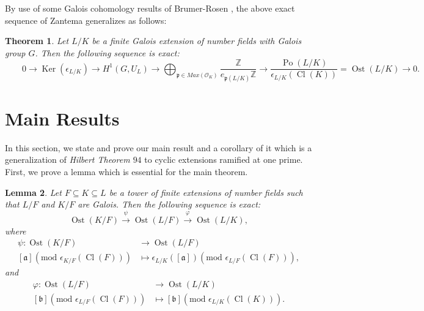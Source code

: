 \documentclass{amsart}
\newtheorem{theorem}{Theorem}[section]
\newtheorem{lemma}[theorem]{Lemma}
\theoremstyle{definition}
\numberwithin{equation}{section}
\DeclareMathOperator{\Po}{Po}
\DeclareMathOperator{\Ost}{Ost}
\DeclareMathOperator{\Cl}{Cl}
\DeclareMathOperator{\Ker}{Ker}
\begin{document}
By use of some Galois cohomology results of Brumer-Rosen \cite{Brumer-Rosen}, the above exact sequence of Zantema generalizes as follows:

\begin{theorem} \cite[Theorem 2.2]{MR2} \label{theorem, generalization of the Zantema's exact sequence}
	Let $L/K$ be a finite Galois extension of number fields with Galois group $G$. Then the following sequence is exact:
	{\footnotesize
		\begin{equation*} \label{equation, BRZ exact sequence}
				\tag{BRZ} \qquad 
			0 \rightarrow \Ker({\epsilon}_{L/K}) \rightarrow H^1(G,U_L) \rightarrow \bigoplus_{\mathfrak{p} \in Max(\mathcal{O}_K)} \frac{\mathbb{Z}}{e_{\mathfrak{p}(L/K)}\mathbb{Z}} \rightarrow \frac{\Po(L/K)}{{\epsilon}_{L/K}(\Cl(K))}=\Ost(L/K) \rightarrow 0.
	\end{equation*}}
\end{theorem}





\section{Main Results}

In this section, we state and prove our main result and a corollary of it which is a generalization of \textit{Hilbert Theorem $94$} to cyclic extensions ramified at one prime. First, we prove a lemma which is essential for the main theorem.

\begin{lemma} \label{lemma, short exact sequence of Ostrowski qoutients}
Let $F \subseteq K \subseteq L$ be a tower of finite extensions of number fields such that $L/F$ and $K/F$ are Galois. 
Then the following sequence is exact:
\begin{equation} \label{equation, short exact sequences for Ostrowski qoutients}
\Ost(K/F) \xrightarrow{\psi} \Ost(L/F) \xrightarrow{\varphi} \Ost(L/K),
\end{equation}
where 
\begin{align*}
\psi: \Ost(K/F) &\rightarrow \Ost(L/F) \\
[\mathfrak{a}]  \left( \mathrm{mod}\, \, \epsilon_{K/F}(\Cl(F)) \right) & \mapsto \epsilon_{L/K}([\mathfrak{a}])  \left( \mathrm{mod}\, \, \epsilon_{L/F}(\Cl(F)) \right),
\end{align*} 
and
\begin{align*}
\varphi: \Ost(L/F) &\rightarrow \Ost(L/K)  \\
[\mathfrak{b}]  \left( \mathrm{mod}\, \, \epsilon_{L/F}(\Cl(F)) \right) & \mapsto [\mathfrak{b}]  \left( \mathrm{mod}\, \, \epsilon_{L/K}(\Cl(K)) \right).\nonumber
\end{align*}
\end{lemma}
\end{document}
